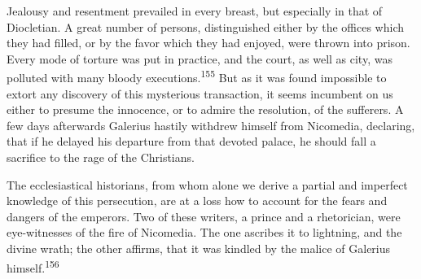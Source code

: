 Jealousy and resentment prevailed in every breast, but especially
in that of Diocletian. A great number of persons, distinguished
either by the offices which they had filled, or by the favor
which they had enjoyed, were thrown into prison. Every mode of
torture was put in practice, and the court, as well as city, was
polluted with many bloody executions.\textsuperscript{155} But as it was found
impossible to extort any discovery of this mysterious
transaction, it seems incumbent on us either to presume the
innocence, or to admire the resolution, of the sufferers. A few
days afterwards Galerius hastily withdrew himself from Nicomedia,
declaring, that if he delayed his departure from that devoted
palace, he should fall a sacrifice to the rage of the Christians.

The ecclesiastical historians, from whom alone we derive a
partial and imperfect knowledge of this persecution, are at a
loss how to account for the fears and dangers of the emperors.
Two of these writers, a prince and a rhetorician, were
eye-witnesses of the fire of Nicomedia. The one ascribes it to
lightning, and the divine wrath; the other affirms, that it was
kindled by the malice of Galerius himself.\textsuperscript{156}




